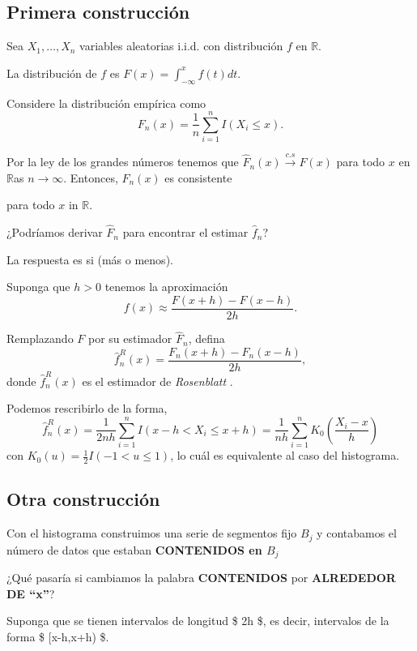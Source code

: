 \documentclass[
  12pt,
]{book}
\theoremstyle{definition}
\theoremstyle{definition}
\theoremstyle{definition}
\theoremstyle{remark}
\let\BeginKnitrBlock\begin \let\EndKnitrBlock\end
\begin{document}
\hypertarget{primera-construcciuxf3n}{%
\subsection{Primera construcción}\label{primera-construcciuxf3n}}

Sea \(X_{1},\ldots,X_{n}\) variables aleatorias i.i.d. con distribución \(f\) en \(\mathbb{R}\).

La distribución de \(f\) es \(F(x)=\int_{-\infty}^{x}f(t)dt\).

Considere la distribución empírica como
\[
F_{n}(x)=\frac{1}{n}\sum_{i=1}^{n}I(X_{i}\leq x).
\]

Por la ley de los grandes números tenemos que \(\hat{F}_{n}(x) \xrightarrow{c.s} F(x)\) para todo \(x\) en \(\mathbb{R}\)as
\(n\rightarrow\infty\). Entonces, \(F_{n}(x)\) es consistente

para todo \(x\) in \(\mathbb{R}\).

\BeginKnitrBlock{remark}
{}¿Podríamos derivar \(\hat{F}_n\) para encontrar el estimar \(\hat{f}_n\)?
\EndKnitrBlock{remark}

La respuesta es si (más o menos).

Suponga que \(h>0\) tenemos la aproximación
\[
f(x)\approx\frac{F(x+h)-F(x-h)}{2h}.
\]

Remplazando \(F\) por su estimador \(\hat{F}_{n}\), defina
\[
\hat{f}_{n}^{R}(x)=\frac{F_{n}(x+h)-F_{n}(x-h)}{2h},
\]
donde \(\hat{f}_{n}^{R}(x)\) es el estimador de \emph{Rosenblatt }.

Podemos rescribirlo de la forma,
\[
\hat{f}_{n}^{R}(x)=\frac{1}{2nh}\sum_{i=1}^{n}I(x-h<X_{i}\leq x+h)=\frac{1}{nh}\sum_{i=1}^{n}K_{0}\left(\frac{X_{i}-x}{h}\right)
\]
con \(K_{0}(u)=\frac{1}{2}I(-1<u\leq1)\), lo cuál es equivalente al caso del histograma.

\hypertarget{otra-construcciuxf3n}{%
\subsection{Otra construcción}\label{otra-construcciuxf3n}}

Con el histograma construimos una serie de segmentos fijo \(B_{j}\) y contabamos el número de datos que estaban \textbf{CONTENIDOS en \(B_{j}\)}

\BeginKnitrBlock{remark}
{}¿Qué pasaría si cambiamos la palabra \textbf{CONTENIDOS} por \textbf{ALREDEDOR DE \enquote{x}}?
\EndKnitrBlock{remark}

Suponga que se tienen intervalos de longitud \$ 2h \$, es decir, intervalos de la forma \$ {[}x-h,x+h) \$.
\end{document}
